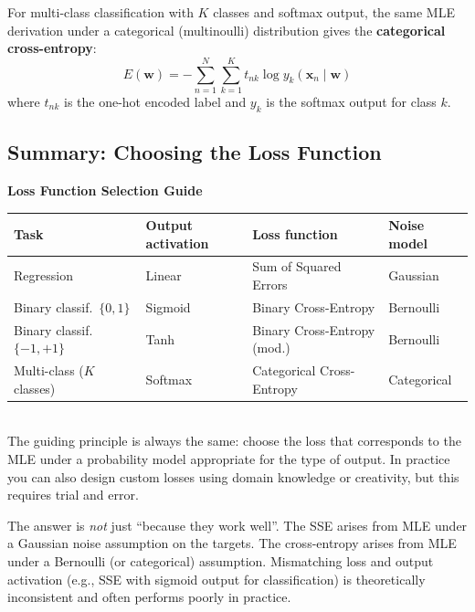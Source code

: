 \documentclass[11pt,a4paper]{article}
\newcommand{\term}[1]{\textcolor{DefGreen}{\textbf{#1}}}
\begin{document}
For multi-class classification with $K$ classes and softmax output, the same MLE derivation under a categorical (multinoulli) distribution gives the \term{categorical cross-entropy}:
\[
E(\mathbf{w}) = -\sum_{n=1}^N \sum_{k=1}^K t_{nk} \log y_k(\mathbf{x}_n \mid \mathbf{w})
\]
where $t_{nk}$ is the one-hot encoded label and $y_k$ is the softmax output for class $k$.

\subsection{Summary: Choosing the Loss Function}

\begin{tcolorbox}[colback=LightBlue,colframe=AccentBlue,boxrule=0.8pt,arc=3pt]
\textbf{Loss Function Selection Guide}\\[6pt]
\begin{tabular}{@{}llll@{}}
\toprule
\textbf{Task} & \textbf{Output activation} & \textbf{Loss function} & \textbf{Noise model} \\
\midrule
Regression & Linear & Sum of Squared Errors & Gaussian \\
Binary classif.\ $\{0,1\}$ & Sigmoid & Binary Cross-Entropy & Bernoulli \\
Binary classif.\ $\{-1,+1\}$ & Tanh & Binary Cross-Entropy (mod.) & Bernoulli \\
Multi-class ($K$ classes) & Softmax & Categorical Cross-Entropy & Categorical \\
\bottomrule
\end{tabular}\\[6pt]
The guiding principle is always the same: choose the loss that corresponds to the MLE under a probability model appropriate for the type of output. In practice you can also design custom losses using domain knowledge or creativity, but this requires trial and error.
\end{tcolorbox}

\begin{warnbox}
The answer is \emph{not} just ``because they work well''. The SSE arises from MLE under a Gaussian noise assumption on the targets. The cross-entropy arises from MLE under a Bernoulli (or categorical) assumption. Mismatching loss and output activation (e.g., SSE with sigmoid output for classification) is theoretically inconsistent and often performs poorly in practice.
\end{warnbox}
\end{document}
